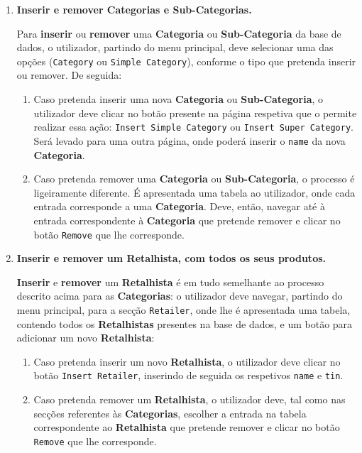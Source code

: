 \documentclass[12pt,a4paper]{article}
\begin{document}
  \begin{enumerate}
    \item \textbf{Inserir e remover Categorias e Sub-Categorias.}
    
    Para \textbf{inserir} ou \textbf{remover} uma \textbf{Categoria} ou \textbf{Sub-Categoria}
    da base de dados, o utilizador, partindo do menu principal, deve selecionar
    uma das opções (\texttt{Category} ou \texttt{Simple Category}), conforme o tipo
    que pretenda inserir ou remover. De seguida:

    \begin{enumerate}
      \item Caso pretenda inserir uma nova \textbf{Categoria} ou \textbf{Sub-Categoria},
      o utilizador deve clicar no botão presente na página respetiva que o permite
      realizar essa ação: \texttt{Insert Simple Category} ou \texttt{Insert Super Category}.
      Será levado para uma outra página, onde poderá inserir o \texttt{name} da nova
      \textbf{Categoria}.

      \item Caso pretenda remover uma \textbf{Categoria} ou \textbf{Sub-Categoria},
      o processo é ligeiramente diferente. É apresentada uma tabela ao utilizador,
      onde cada entrada corresponde a uma \textbf{Categoria}. Deve, então, navegar
      até à entrada correspondente à \textbf{Categoria} que pretende remover e
      clicar no botão \texttt{Remove} que lhe corresponde. 
    \end{enumerate}
    
    \item \textbf{Inserir e remover um Retalhista, com todos os seus produtos.}
    
    \textbf{Inserir} e \textbf{remover} um \textbf{Retalhista} é em tudo semelhante ao processo
    descrito acima para as \textbf{Categorias}: o utilizador deve navegar,
    partindo do menu principal, para a secção \texttt{Retailer}, onde lhe é
    apresentada uma tabela, contendo todos os \textbf{Retalhistas} presentes na
    base de dados, e um botão para adicionar um novo \textbf{Retalhista}:

    \begin{enumerate}
      \item Caso pretenda inserir um novo \textbf{Retalhista}, o utilizador
      deve clicar no botão \texttt{Insert Retailer}, inserindo de seguida os respetivos
      \texttt{name} e \texttt{tin}.

      \item Caso pretenda remover um \textbf{Retalhista}, o utilizador deve, tal
      como nas secções referentes às \textbf{Categorias}, escolher a entrada na
      tabela correspondente ao \textbf{Retalhista} que pretende remover e clicar
      no botão \texttt{Remove} que lhe corresponde.
    \end{enumerate}
    

\end{enumerate}
\end{document}
